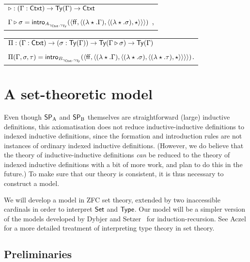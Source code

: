 \documentclass{schwicht}
\begin{document}
\begin{description}
\begin{tabular}{l}
  $\triangleright : (\Gamma : \mathsf{Ctxt}) \to \mathsf{Ty}(\Gamma) \to \mathsf{Ctxt}$ \\
  $\Gamma \triangleright \sigma = \mathsf{intro}_{A_{\gamma_{\mathsf{Ctxt}}, \gamma_{\mathsf{Ty}}}}(\langle \mathsf{ff}, \langle (\lambda \star.\Gamma), \langle (\lambda \star.\sigma), \star\rangle \rangle\rangle)$ \enspace ,\\
\end{tabular}
\vskip 0.2cm
\begin{tabular}{l}
$\Pi : (\Gamma : \mathsf{Ctxt}) \to (\sigma : \mathsf{Ty}(\Gamma)) \to \mathsf{Ty}(\Gamma \triangleright \sigma) \to
\mathsf{Ty}(\Gamma)$ \\
$\Pi(\Gamma, \sigma, \tau) = \mathsf{intro}_{B_{\gamma_{\mathsf{Ctxt}}, \gamma_{\mathsf{Ty}}}}(\langle \mathsf{ff}, \langle (\lambda
    \star.\Gamma), \langle (\lambda \star.\sigma),\langle (\lambda \star. \tau) , \star\rangle\rangle \rangle\rangle)$\enspace .
\end{tabular}
\end{description}

\section{A set-theoretic model}
\label{sec:model}

Even though $\mathsf{SP}_{\mathrm{A}}$ and $\mathsf{SP}_{\mathrm{B}}$ themselves are straightforward (large)
inductive definitions, this axiomatisation does not reduce
inductive-inductive definitions to indexed inductive definitions,
since the formation and introduction rules are not instances of
ordinary indexed inductive definitions.  (However, we do believe that
the theory of inductive-inductive definitions \emph{can} be reduced to
the theory of indexed inductive definitions with a bit of more
work, and plan to do this in the future.)
To make sure that our theory is consistent, it is thus necessary to
construct a model.

We will develop a model in ZFC set theory, extended by two
inaccessible cardinals in order to interpret $\mathsf{Set}$ and $\mathsf{Type}$.  Our
model will be a simpler version of the models developed by Dybjer and
Setzer~\cite{dybjersetzer1999finax,dybjersetzer2006IIR} for
induction-recursion.
See Aczel \cite{aczel1999typesandsets} for a more detailed treatment
of interpreting type theory in set theory.



\subsection{Preliminaries}
\end{document}
